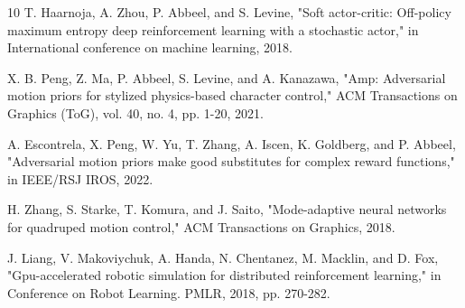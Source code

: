 \documentclass[letterpaper, 10pt, conference]{IEEEtran}
\begin{document}
\begin{thebibliography}{10}
 T. Haarnoja, A. Zhou, P. Abbeel, and S. Levine, "Soft actor-critic: Off-policy maximum entropy deep reinforcement learning with a stochastic actor," in International conference on machine learning, 2018.

 X. B. Peng, Z. Ma, P. Abbeel, S. Levine, and A. Kanazawa, "Amp: Adversarial motion priors for stylized physics-based character control," ACM Transactions on Graphics (ToG), vol. 40, no. 4, pp. 1-20, 2021.

 A. Escontrela, X. Peng, W. Yu, T. Zhang, A. Iscen, K. Goldberg, and P. Abbeel, "Adversarial motion priors make good substitutes for complex reward functions," in IEEE/RSJ IROS, 2022.

 H. Zhang, S. Starke, T. Komura, and J. Saito, "Mode-adaptive neural networks for quadruped motion control," ACM Transactions on Graphics, 2018.

 J. Liang, V. Makoviychuk, A. Handa, N. Chentanez, M. Macklin, and D. Fox, "Gpu-accelerated robotic simulation for distributed reinforcement learning," in Conference on Robot Learning. PMLR, 2018, pp. 270-282.

\end{thebibliography}
\end{document}
